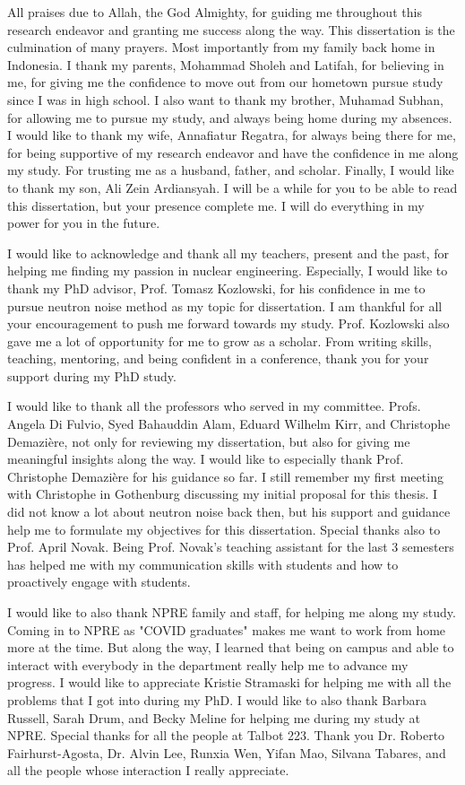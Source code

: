 \documentclass{uiucthesis2021}
\begin{document}
\begin{acknowledgments}

All praises due to Allah, the God Almighty, for guiding me throughout this research endeavor and granting me success along the way. This dissertation is the culmination of many prayers. Most importantly from my family back home in Indonesia. I thank my parents, Mohammad Sholeh and Latifah, for believing in me, for giving me the confidence to move out from our hometown pursue study since I was in high school. I also want to thank my brother, Muhamad Subhan, for allowing me to pursue my study, and always being home during my absences. I would like to thank my wife, Annafiatur Regatra, for always being there for me, for being supportive of my research endeavor and have the confidence in me along my study. For trusting me as a husband, father, and scholar. Finally, I would like to thank my son, Ali Zein Ardiansyah. I will be a while for you to be able to read this dissertation, but your presence complete me. I will do everything in my power for you in the future.

I would like to acknowledge and thank all my teachers, present and the past, for helping me finding my passion in nuclear engineering. Especially, I would like to thank my PhD advisor, Prof. Tomasz Kozlowski, for his confidence in me to pursue neutron noise method as my topic for dissertation. I am thankful for all your encouragement to push me forward towards my study. Prof. Kozlowski also gave me a lot of opportunity for me to grow as a scholar. From writing skills, teaching, mentoring, and being confident in a conference, thank you for your support during my PhD study.

I would like to thank all the professors who served in my committee. Profs. Angela Di Fulvio, Syed Bahauddin Alam, Eduard Wilhelm Kirr, and Christophe Demazière, not only for reviewing my dissertation, but also for giving me meaningful insights along the way. I would like to especially thank Prof. Christophe Demazière for his guidance so far. I still remember my first meeting with Christophe in Gothenburg discussing my initial proposal for this thesis. I did not know a lot about neutron noise back then, but his support and guidance help me to formulate my objectives for this dissertation. Special thanks also to Prof. April Novak. Being Prof. Novak's teaching assistant for the last 3 semesters has helped me with my communication skills with students and how to proactively engage with students.

I would like to also thank NPRE family and staff, for helping me along my study. Coming in to NPRE as "COVID graduates" makes me want to work from home more at the time. But along the way, I learned that being on campus and able to interact with everybody in the department really help me to advance my progress. I would like to appreciate Kristie Stramaski for helping me with all the problems that I got into during my PhD. I would like to also thank Barbara Russell, Sarah Drum, and Becky Meline for helping me during my study at NPRE. Special thanks for all the people at Talbot 223. Thank you Dr. Roberto Fairhurst-Agosta, Dr. Alvin Lee, Runxia Wen, Yifan Mao, Silvana Tabares, and all the people whose interaction I really appreciate.


\end{acknowledgments}
\end{document}
